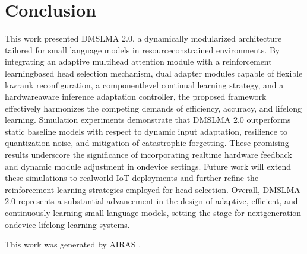 \documentclass{article} %
\begin{document}
\section{Conclusion}
\label{sec:conclusion}
This work presented DMS\-LMA 2.0, a dynamically modularized architecture tailored for small language models in resource\-constrained environments. By integrating an adaptive multi\-head attention module with a reinforcement learning\-based head selection mechanism, dual adapter modules capable of flexible low\-rank reconfiguration, a component\-level continual learning strategy, and a hardware\-aware inference adaptation controller, the proposed framework effectively harmonizes the competing demands of efficiency, accuracy, and lifelong learning. Simulation experiments demonstrate that DMS\-LMA 2.0 outperforms static baseline models with respect to dynamic input adaptation, resilience to quantization noise, and mitigation of catastrophic forgetting. These promising results underscore the significance of incorporating real\-time hardware feedback and dynamic module adjustment in on\-device settings. Future work will extend these simulations to real\-world IoT deployments and further refine the reinforcement learning strategies employed for head selection. Overall, DMS\-LMA 2.0 represents a substantial advancement in the design of adaptive, efficient, and continuously learning small language models, setting the stage for next\-generation on\-device lifelong learning systems.

This work was generated by \textsc{AIRAS} \cite{airas2025}.



\end{document}

